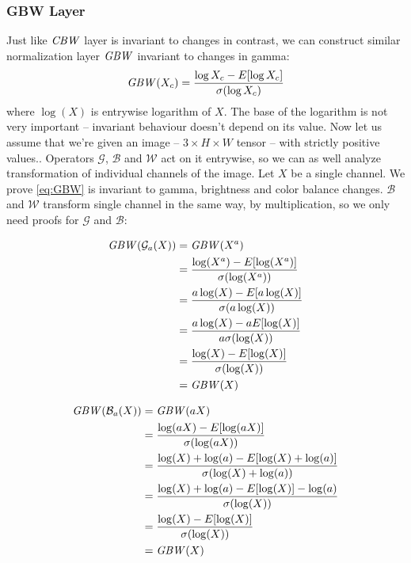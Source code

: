 \subsubsection{GBW Layer}
Just like $\mathit{CBW}$ layer is invariant to changes in contrast,
we can construct similar normalization layer $\mathit{GBW}$ invariant to changes in
gamma:
\begin{equation}
    \mathit{GBW}(X_c) = \frac{\log{X_c}-E[\log{X_c}]}{\sigma(\log{X_c})}
    \label{eq:GBW}
\end{equation}
where $\log(X)$ is entrywise logarithm of $X$. The base of the
logarithm is not very important -- invariant behaviour doesn't depend on its value.
Now let us assume that we're given an image -- $3\times H \times W$ tensor --
with strictly positive values..
Operators $\mathcal{G}$, $\mathcal{B}$ and $\mathcal{W}$ act on it entrywise, so
we can as well analyze transformation of individual channels of the image.
Let $X$ be a single channel.
We prove \ref{eq:GBW} is invariant to gamma, brightness and color balance
changes. $\mathcal{B}$ and $\mathcal{W}$ transform single channel in the same
way, by multiplication,
so we only need proofs for $\mathcal{G}$ and $\mathcal{B}$:

\begin{align*}
    \mathit{GBW}(\mathcal{G}_a(X)) &=
    \mathit{GBW}(X^a) \\
    &= \frac{\log(X^a)-E[\log(X^a)]}{\sigma(\log(X^a))} \\
    &= \frac{a\log(X)-E[a\log(X)]}{\sigma(a\log(X))} \\
    &= \frac{a\log(X)-aE[\log(X)]}{a\sigma(\log(X))} \\
    &= \frac{\log(X)-E[\log(X)]}{\sigma(\log(X))} \\
    &= \mathit{GBW}(X)
\end{align*}

\begin{align*}
    \mathit{GBW}(\mathcal{B}_a(X)) &=
    \mathit{GBW}(aX) \\
    &= \frac{\log(aX)-E[\log(aX)]}{\sigma(\log(aX))} \\
    &= \frac{\log(X)+\log(a)-E[\log(X)+\log(a)]}{\sigma(\log(X)+\log(a))} \\
    &= \frac{\log(X)+\log(a)-E[\log(X)]-\log(a)}{\sigma(\log(X))} \\
    &= \frac{\log(X)-E[\log(X)]}{\sigma(\log(X))} \\
    &= \mathit{GBW}(X)
\end{align*}

